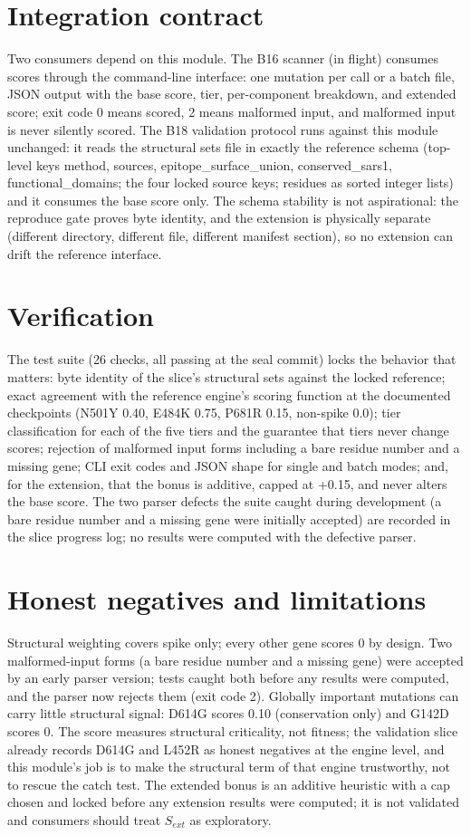 \documentclass[11pt]{article}
\begin{document}
\section{Integration contract}
Two consumers depend on this module. The B16 scanner (in flight) consumes scores through the command-line interface: one mutation per call or a batch file, JSON output with the base score, tier, per-component breakdown, and extended score; exit code 0 means scored, 2 means malformed input, and malformed input is never silently scored. The B18 validation protocol runs against this module unchanged: it reads the structural sets file in exactly the reference schema (top-level keys method, sources, epitope\_surface\_union, conserved\_sars1, functional\_domains; the four locked source keys; residues as sorted integer lists) and it consumes the base score only. The schema stability is not aspirational: the reproduce gate proves byte identity, and the extension is physically separate (different directory, different file, different manifest section), so no extension can drift the reference interface.

\section{Verification}
The test suite (26 checks, all passing at the seal commit) locks the behavior that matters: byte identity of the slice's structural sets against the locked reference; exact agreement with the reference engine's scoring function at the documented checkpoints (N501Y 0.40, E484K 0.75, P681R 0.15, non-spike 0.0); tier classification for each of the five tiers and the guarantee that tiers never change scores; rejection of malformed input forms including a bare residue number and a missing gene; CLI exit codes and JSON shape for single and batch modes; and, for the extension, that the bonus is additive, capped at +0.15, and never alters the base score. The two parser defects the suite caught during development (a bare residue number and a missing gene were initially accepted) are recorded in the slice progress log; no results were computed with the defective parser.

\section{Honest negatives and limitations}
Structural weighting covers spike only; every other gene scores 0 by design. Two malformed-input forms (a bare residue number and a missing gene) were accepted by an early parser version; tests caught both before any results were computed, and the parser now rejects them (exit code 2). Globally important mutations can carry little structural signal: D614G scores 0.10 (conservation only) and G142D scores 0. The score measures structural criticality, not fitness; the validation slice already records D614G and L452R as honest negatives at the engine level, and this module's job is to make the structural term of that engine trustworthy, not to rescue the catch test. The extended bonus is an additive heuristic with a cap chosen and locked before any extension results were computed; it is not validated and consumers should treat $S_{ext}$ as exploratory.
\end{document}
